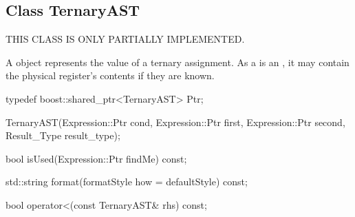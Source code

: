 \subsection{Class TernaryAST}
\label{sec:TernaryAST}


THIS CLASS IS ONLY PARTIALLY IMPLEMENTED.


A  object represents the value of a ternary assignment. As a 
is an , it may contain the physical register's contents if they
are known.

\begin{apient}
  typedef boost::shared_ptr<TernaryAST> Ptr;
\end{apient}

\begin{apient}
  TernaryAST(Expression::Ptr cond, Expression::Ptr first, Expression::Ptr second, Result_Type result_type);
\end{apient}

\begin{apient}
  bool isUsed(Expression::Ptr findMe) const;
\end{apient}

\begin{apient}
  std::string format(formatStyle how = defaultStyle) const;
\end{apient}

\begin{apient}
  bool operator<(const TernaryAST& rhs) const;
\end{apient}


